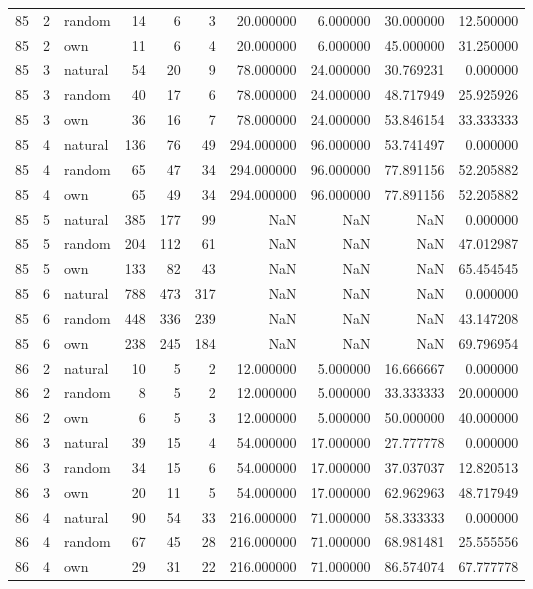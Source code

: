 \begin{table}[htbp]
\begin{tabular}{rrlrrrrrrr}
85 & 2 & random & 14 & 6 & 3 & 20.000000 & 6.000000 & 30.000000 & 12.500000 \\
85 & 2 & own & 11 & 6 & 4 & 20.000000 & 6.000000 & 45.000000 & 31.250000 \\
85 & 3 & natural & 54 & 20 & 9 & 78.000000 & 24.000000 & 30.769231 & 0.000000 \\
85 & 3 & random & 40 & 17 & 6 & 78.000000 & 24.000000 & 48.717949 & 25.925926 \\
85 & 3 & own & 36 & 16 & 7 & 78.000000 & 24.000000 & 53.846154 & 33.333333 \\
85 & 4 & natural & 136 & 76 & 49 & 294.000000 & 96.000000 & 53.741497 & 0.000000 \\
85 & 4 & random & 65 & 47 & 34 & 294.000000 & 96.000000 & 77.891156 & 52.205882 \\
85 & 4 & own & 65 & 49 & 34 & 294.000000 & 96.000000 & 77.891156 & 52.205882 \\
85 & 5 & natural & 385 & 177 & 99 & NaN & NaN & NaN & 0.000000 \\
85 & 5 & random & 204 & 112 & 61 & NaN & NaN & NaN & 47.012987 \\
85 & 5 & own & 133 & 82 & 43 & NaN & NaN & NaN & 65.454545 \\
85 & 6 & natural & 788 & 473 & 317 & NaN & NaN & NaN & 0.000000 \\
85 & 6 & random & 448 & 336 & 239 & NaN & NaN & NaN & 43.147208 \\
85 & 6 & own & 238 & 245 & 184 & NaN & NaN & NaN & 69.796954 \\
86 & 2 & natural & 10 & 5 & 2 & 12.000000 & 5.000000 & 16.666667 & 0.000000 \\
86 & 2 & random & 8 & 5 & 2 & 12.000000 & 5.000000 & 33.333333 & 20.000000 \\
86 & 2 & own & 6 & 5 & 3 & 12.000000 & 5.000000 & 50.000000 & 40.000000 \\
86 & 3 & natural & 39 & 15 & 4 & 54.000000 & 17.000000 & 27.777778 & 0.000000 \\
86 & 3 & random & 34 & 15 & 6 & 54.000000 & 17.000000 & 37.037037 & 12.820513 \\
86 & 3 & own & 20 & 11 & 5 & 54.000000 & 17.000000 & 62.962963 & 48.717949 \\
86 & 4 & natural & 90 & 54 & 33 & 216.000000 & 71.000000 & 58.333333 & 0.000000 \\
86 & 4 & random & 67 & 45 & 28 & 216.000000 & 71.000000 & 68.981481 & 25.555556 \\
86 & 4 & own & 29 & 31 & 22 & 216.000000 & 71.000000 & 86.574074 & 67.777778 \\

\end{tabular}
\end{table}

